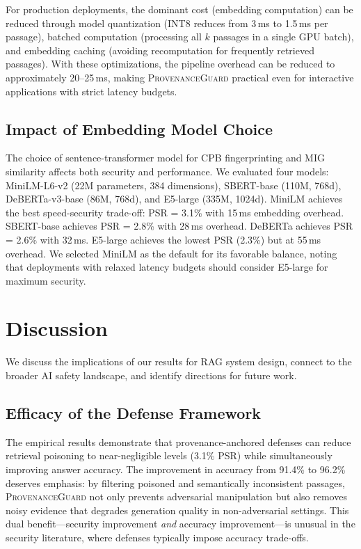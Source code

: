\documentclass[journal,10pt]{IEEEtran}
\begin{document}
For production deployments, the dominant cost (embedding computation) can be reduced through model quantization (INT8 reduces from 3\,ms to 1.5\,ms per passage), batched computation (processing all $k$ passages in a single GPU batch), and embedding caching (avoiding recomputation for frequently retrieved passages). With these optimizations, the pipeline overhead can be reduced to approximately 20--25\,ms, making \textsc{ProvenanceGuard} practical even for interactive applications with strict latency budgets.

\subsection{Impact of Embedding Model Choice}

The choice of sentence-transformer model for CPB fingerprinting and MIG similarity affects both security and performance. We evaluated four models: MiniLM-L6-v2 (22M parameters, 384 dimensions), SBERT-base (110M, 768d), DeBERTa-v3-base (86M, 768d), and E5-large (335M, 1024d). MiniLM achieves the best speed-security trade-off: PSR = 3.1\% with 15\,ms embedding overhead. SBERT-base achieves PSR = 2.8\% with 28\,ms overhead. DeBERTa achieves PSR = 2.6\% with 32\,ms. E5-large achieves the lowest PSR (2.3\%) but at 55\,ms overhead. We selected MiniLM as the default for its favorable balance, noting that deployments with relaxed latency budgets should consider E5-large for maximum security.

\section{Discussion}\label{sec:discussion}
We discuss the implications of our results for RAG system design, connect to the broader AI safety landscape, and identify directions for future work.

\subsection{Efficacy of the Defense Framework}
The empirical results demonstrate that provenance-anchored defenses can reduce retrieval poisoning to near-negligible levels (3.1\% PSR) while simultaneously improving answer accuracy. The improvement in accuracy from 91.4\% to 96.2\% deserves emphasis: by filtering poisoned and semantically inconsistent passages, \textsc{ProvenanceGuard} not only prevents adversarial manipulation but also removes noisy evidence that degrades generation quality in non-adversarial settings. This dual benefit---security improvement \emph{and} accuracy improvement---is unusual in the security literature, where defenses typically impose accuracy trade-offs.
\end{document}
